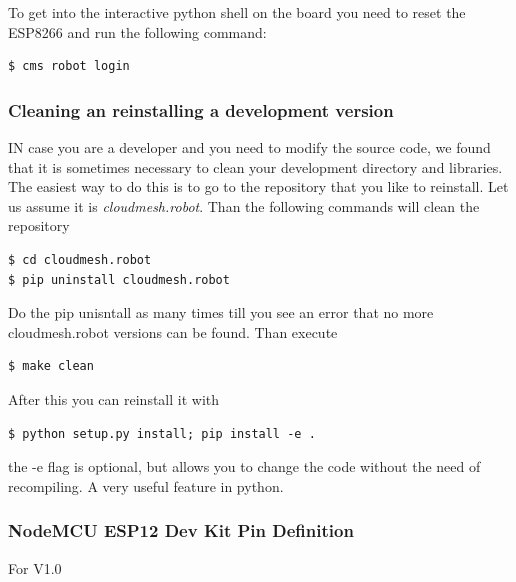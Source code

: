 To get into the interactive python shell on the board you need to reset
the ESP8266 and run the following command:

\begin{verbatim}
$ cms robot login
\end{verbatim}

\subsubsection{Cleaning an reinstalling a development
version}\label{cleaning-an-reinstalling-a-development-version}

IN case you are a developer and you need to modify the source code, we
found that it is sometimes necessary to clean your development directory
and libraries. The easiest way to do this is to go to the repository
that you like to reinstall. Let us assume it is \emph{cloudmesh.robot}.
Than the following commands will clean the repository

\begin{verbatim}
$ cd cloudmesh.robot
$ pip uninstall cloudmesh.robot
\end{verbatim}

Do the pip unisntall as many times till you see an error that no more
cloudmesh.robot versions can be found. Than execute

\begin{verbatim}
$ make clean
\end{verbatim}

After this you can reinstall it with

\begin{verbatim}
$ python setup.py install; pip install -e .
\end{verbatim}

the -e flag is optional, but allows you to change the code without the
need of recompiling. A very useful feature in python.

\subsubsection{NodeMCU ESP12 Dev Kit Pin
Definition}\label{nodemcu-esp12-dev-kit-pin-definition}

For V1.0

